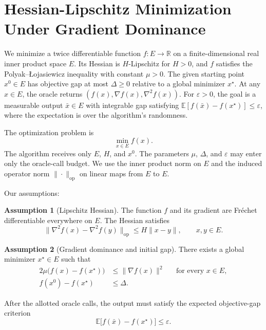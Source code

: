 \documentclass[10pt]{article}
\theoremstyle{definition}
\newtheorem{assumption}{Assumption}
\begin{document}
\section*{Hessian-Lipschitz Minimization Under Gradient Dominance}
We minimize a twice differentiable function $f:E\to\mathbb{R}$ on a finite-dimensional real inner product space $E$. Its Hessian is $H$-Lipschitz for $H>0$, and $f$ satisfies the Polyak--{\L}ojasiewicz inequality with constant $\mu>0$. The given starting point $x^0\in E$ has objective gap at most $\Delta\geq 0$ relative to a global minimizer $x^\star$. At any $x\in E$, the oracle returns $(f(x),\nabla f(x),\nabla^2 f(x))$. For $\varepsilon>0$, the goal is a measurable output $\bar{x}\in E$ with integrable gap satisfying $\mathbb{E}[f(\bar{x})-f(x^\star)]\leq\varepsilon$, where the expectation is over the algorithm's randomness.

The optimization problem is
\[
\min_{x\in E} f(x).
\]
The algorithm receives only $E$, $H$, and $x^0$. The parameters $\mu$, $\Delta$, and $\varepsilon$ may enter only the oracle-call budget. We use the inner product norm on $E$ and the induced operator norm $\|\cdot\|_{\mathrm{op}}$ on linear maps from $E$ to $E$.

Our assumptions:
\begin{assumption}[Lipschitz Hessian]
The function $f$ and its gradient are Fr\'echet differentiable everywhere on $E$. The Hessian satisfies
\[
\|\nabla^2 f(x)-\nabla^2 f(y)\|_{\mathrm{op}}\leq H\|x-y\|,
\qquad x,y\in E.
\]
\end{assumption}

\begin{assumption}[Gradient dominance and initial gap]
There exists a global minimizer $x^\star\in E$ such that
\[
\begin{aligned}
2\mu\bigl(f(x)-f(x^\star)\bigr)&\leq \|\nabla f(x)\|^2 &&\text{for every }x\in E,\\
f(x^0)-f(x^\star)&\leq \Delta.
\end{aligned}
\]
\end{assumption}

After the allotted oracle calls, the output must satisfy the expected objective-gap criterion
\[
\mathbb{E}\bigl[f(\bar{x})-f(x^\star)\bigr]\leq\varepsilon.
\]
\end{document}
